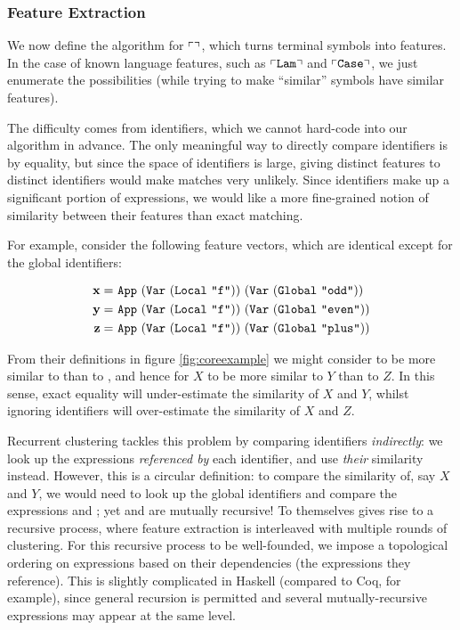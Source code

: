 \subsubsection{Feature Extraction}

We now define the algorithm for $\left\ulcorner  \right\urcorner$, which turns terminal symbols into features. In the case of known language features, such as $\left\ulcorner \texttt{Lam} \right\urcorner$ and $\left\ulcorner \texttt{Case} \right\urcorner$, we just enumerate the possibilities (while trying to make ``similar'' symbols have similar features).

The difficulty comes from identifiers, which we cannot hard-code into our algorithm in advance. The only meaningful way to directly compare identifiers is by equality, but since the space of identifiers is large, giving distinct features to distinct identifiers would make matches very unlikely. Since identifiers make up a significant portion of expressions, we would like a more fine-grained notion of similarity between their features than exact matching.

For example, consider the following feature vectors, which are identical except for the global identifiers:

\begin{equation*}
  \begin{split}
    \vect{x} =\ & \texttt{App}\ (\texttt{Var}\ (\texttt{Local}\ \texttt{"f"}))\ (\texttt{Var}\ (\texttt{Global}\ \texttt{"odd"})) \\
    \vect{y} =\ & \texttt{App}\ (\texttt{Var}\ (\texttt{Local}\ \texttt{"f"}))\ (\texttt{Var}\ (\texttt{Global}\ \texttt{"even"})) \\
    \vect{z} =\ & \texttt{App}\ (\texttt{Var}\ (\texttt{Local}\ \texttt{"f"}))\ (\texttt{Var}\ (\texttt{Global}\ \texttt{"plus"}))
  \end{split}
\end{equation*}

From their definitions in figure \ref{fig:coreexample} we might consider  to be more similar to  than to , and hence for $X$ to be more similar to $Y$ than to $Z$. In this sense, exact equality will under-estimate the similarity of $X$ and $Y$, whilst ignoring identifiers will over-estimate the similarity of $X$ and $Z$.

Recurrent clustering tackles this problem by comparing identifiers \emph{indirectly}: we look up the expressions \emph{referenced by} each identifier, and use \emph{their} similarity instead. However, this is a circular definition: to compare the similarity of, say $X$ and $Y$, we would need to look up the global identifiers and compare the expressions  and ; yet  and  are mutually recursive! To  themselves gives rise to a recursive process, where feature extraction is interleaved with multiple rounds of clustering. For this recursive process to be well-founded, we impose a topological ordering on expressions based on their dependencies (the expressions they reference). This is slightly complicated in Haskell (compared to Coq, for example), since general recursion is permitted and several mutually-recursive expressions may appear at the same level.

